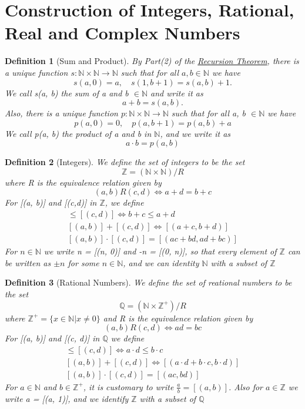 \documentclass[11pt, oneside]{book}
\theoremstyle{break}
\newtheorem{defn}{Definition}[section]
\newcommand{\bb}[1]{\mathbb{#1}}			%
\begin{document}
\section{Construction of Integers, Rational, Real and Complex Numbers}

\begin{defn}[Sum and Product]
	By Part(2) of the \hyperref[recursion_theorem]{Recursion Theorem}, there is a unique function $s: \bb{N} \times \bb{N} \to \bb{N}$ such that for all $a, b \in \bb{N}$ we have
	\[
		s(a, 0) = a, \quad s(1, b + 1) = s(a, b) + 1.
	\]
	We call s(a, b) the sum of a and b $\in \bb{N}$ and write it as
	\[
		a + b = s(a, b).
	\]
	Also, there is a unique function $p: \bb{N} \times \bb{N} \to \bb{N}$ such that for all a, b $\in \bb{N}$ we have
	\[
		p(a, 0) = 0, \quad p(a, b + 1) = p(a, b) + a
	\]
	We call p(a, b) the product of a and b in $\bb{N}$, and we write it as
	\[
		a \cdot b = p(a, b)
	\]
\end{defn}

\begin{defn}[Integers]
	We define the set of integers to be the set
	\[
		\bb{Z} = (\bb{N} \times \bb{N})/R
	\]
	where R is the equivalence relation given by
	\[
		(a, b)R(c,d) \iff a + d = b + c
	\]
	For [(a, b)] and [(c,d)] in $\bb{Z}$, we define
	\begin{gather*}
		[(a, b)] \leq [(c, d)] \iff b + c \leq a + d \\
		[(a, b)] + [(c ,d)] \iff [(a + c, b + d)] \\
		[(a, b)] \cdot [(c, d)] = [(ac + bd, ad + bc)]
	\end{gather*}
	For $n \in \bb{N}$ we write n = [(n, 0)] and -n = [(0, n)], so that every element of $\bb{Z}$ can be written as $\pm n$ for some $n \in \bb{N}$, and we can identity $\bb{N}$ with a subset of $\bb{Z}$
\end{defn}

\begin{defn}[Rational Numbers]
	We define the set of reational numbers to be the set
	\[
		\bb{Q} = (\bb{N} \times \bb{Z}^+)/R
	\]
	where $\bb{Z}^+ = \{x \in \bb{N} | x \neq 0\}$ and R is the equivalence relation given by
	\[
		(a, b)R(c, d) \iff ad = bc
	\]
	For [(a, b)] and [(c, d)] in $\bb{Q}$ we define
	\begin{gather*}
		[(a, b)] \leq [(c, d)] \iff a \cdot d \leq b \cdot c \\
		[(a, b)] + [(c ,d)] \iff [(a \cdot d + b \cdot c, b \cdot d)] \\
		[(a, b)] \cdot [(c, d)] = [(ac, bd)]
	\end{gather*}
	For $a \in \bb{N}$ and $b \in \bb{Z}^+$, it is customary to write $\frac{a}{b} = [(a, b)]$. Also for $a \in \bb{Z}$ we write a = [(a, 1)], and we identify $\bb{Z}$ with a subset of $\bb{Q}$
\end{defn}
\end{document}

